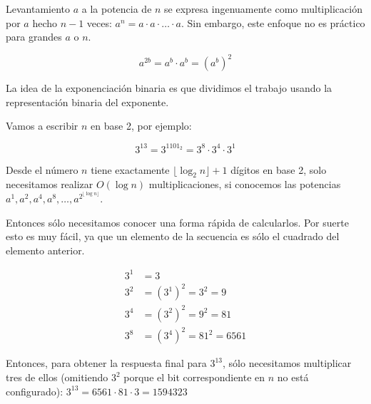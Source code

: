 Levantamiento $a$ a la potencia de $n$ se expresa ingenuamente como multiplicación por $a$ hecho $n-1$
 veces: $a^{n} = a \cdot a \cdot \ldots \cdot a$. Sin embargo, este enfoque no es práctico para grandes $a$ o $n$.

$$a^{2b} = a^b \cdot a^b = (a^b)^2$$


La idea de la exponenciación binaria es que dividimos el trabajo usando la representación binaria del exponente.

Vamos a escribir $n$ en base 2, por ejemplo:

$$3^{13} = 3^{1101_2} = 3^8 \cdot 3^4 \cdot 3^1$$

Desde el número $n$ tiene exactamente $\lfloor \log_2 n \rfloor + 1$ dígitos en base 2, solo necesitamos realizar $O(\log n)$ multiplicaciones, si conocemos las potencias $a^1, a^2, a^4, a^8, \dots, a^{2^{\lfloor \log n \rfloor}}$.

Entonces sólo necesitamos conocer una forma rápida de calcularlos. Por suerte esto es muy fácil, ya que un elemento de la secuencia es sólo el cuadrado del elemento anterior.

\begin{align}
	3^1 &= 3 \\
	3^2 &= \left(3^1\right)^2 = 3^2 = 9 \\
	3^4 &= \left(3^2\right)^2 = 9^2 = 81 \\
	3^8 &= \left(3^4\right)^2 = 81^2 = 6561
\end{align}

Entonces, para obtener la respuesta final para $3^{13}$, sólo necesitamos multiplicar tres de ellos (omitiendo $3^2$ porque el bit correspondiente en $n$ no está configurado): $3^{13} = 6561 \cdot 81 \cdot 3 = 1594323$


